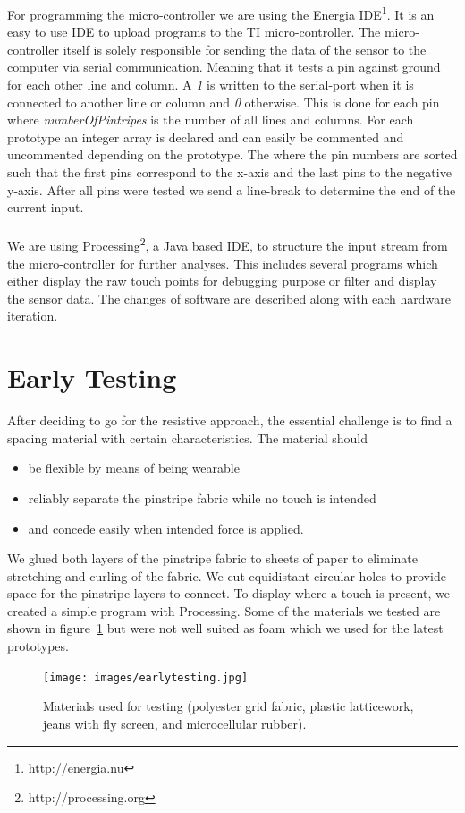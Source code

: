 For programming the micro-controller we are using the \href{http://energia.nu}{Energia IDE}\footnote{http://energia.nu}. It is an easy to use IDE to upload programs to the TI micro-controller. The micro-controller itself is solely responsible for sending the data of the sensor to the computer via serial communication. Meaning that it tests a pin against ground for each other line and column. A \emph{1} is written to the serial-port when it is connected to another line or column and \emph{0} otherwise. This is done for each pin where \emph{numberOfPintripes} is the number of all lines and columns. For each prototype an integer array is declared and can easily be commented and uncommented depending on the prototype. The where the pin numbers are sorted such that the first pins correspond to the x-axis and the last pins to the negative y-axis. After all pins were tested we send a line-break to determine the end of the current input.\\  \\

We are using \href{http://processing.org}{Processing}\footnote{http://processing.org}, a Java based IDE, to structure the input stream from the micro-controller for further analyses. This includes several programs which either display the raw touch points for debugging purpose or filter and display the sensor data. The changes of software are described along with each hardware iteration. 

\section{Early Testing}
After deciding to go for the resistive approach, the essential challenge is to find a spacing material with certain characteristics. The material should
\begin{itemize}
\item be flexible by means of being wearable
\item reliably separate the pinstripe fabric while no touch is intended
\item and concede easily when intended force is applied.
\end{itemize}
We glued both layers of the pinstripe fabric to sheets of paper to eliminate stretching and curling of the fabric. We cut equidistant circular holes to provide space for the pinstripe layers to connect. To display where a touch is present, we created a simple program with Processing. Some of the materials we tested are shown in figure~\ref{fig:earlymats} but were not well suited as foam which we used for the latest prototypes.
\begin{figure}
\texttt{[image: images/earlytesting.jpg]}
\caption{Materials used for testing (polyester grid fabric, plastic latticework, jeans with fly screen, and microcellular rubber).}
\label{fig:earlymats}
\end{figure}


